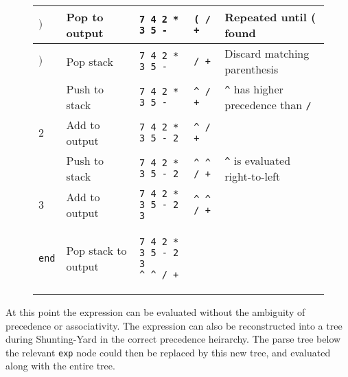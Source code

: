 \documentclass[12pt, letterpaper]{article}
\theoremstyle{definition}
\begin{document}
\begin{figure}[H]
\begin{center}
\begin{tabular}{| m{1.2cm} | m{3.1cm} | m{3.6cm} | m{2.3cm} | m{3.5cm} |}
            \hline
            $)$ & Pop to output & \verb|7 4 2 * 3 5 -| & \verb|( / +| & Repeated until ( found\\
            \hline
            $)$ & Pop stack & \verb|7 4 2 * 3 5 -| & \verb|/ +| & Discard matching parenthesis\\
            \hline
            $\hat{}$ & Push to stack & \verb|7 4 2 * 3 5 -| & \verb|^ / +| & \verb|^| has higher precedence than \verb|/|\\
            \hline
            $2$ & Add to output & \verb|7 4 2 * 3 5 - 2| & \verb|^ / +| &\\
            \hline
            $\hat{}$ & Push to stack & \verb|7 4 2 * 3 5 - 2| & \verb|^ ^ / +| & \verb|^| is evaluated right-to-left\\
            \hline
            $3$ & Add to output & \verb|7 4 2 * 3 5 - 2 3| & \verb|^ ^ / +| &\\
            \hline
            \verb|end| & Pop stack to output & \begin{verbatim}
7 4 2 * 3 5 - 2 3
^ ^ / +
            \end{verbatim} & & \\
            \hline
        \end{tabular}
    \end{center}
\end{figure}

At this point the expression can be evaluated without the ambiguity of precedence or associativity. The expression can also be reconstructed into a tree during Shunting-Yard in the correct precedence heirarchy. The parse tree below the relevant \verb|exp| node could then be replaced by this new tree, and evaluated along with the entire tree.

\pagebreak

\nocite{*}
\printbibliography

\end{document}
